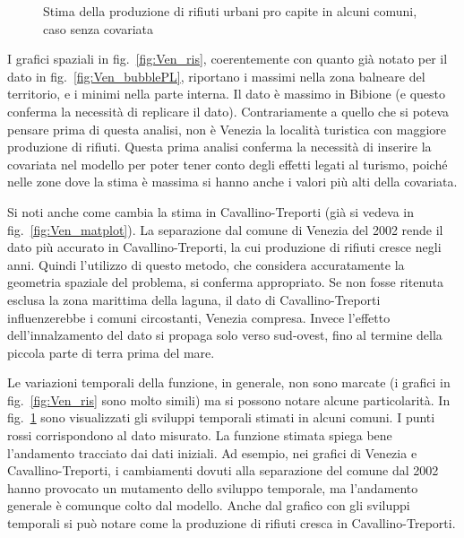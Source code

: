 \documentclass[a4paper,11pt,twoside,openright]{book}							%
\begin{document}
\begin{figure}[t]
{   }
	\caption{Stima della produzione di rifiuti urbani pro capite in alcuni comuni, caso senza covariata}
	\label{fig:Ven_tempo}
\end{figure}

I grafici spaziali in fig.~\ref{fig:Ven_ris}, coerentemente con quanto già notato per il dato in fig.~\ref{fig:Ven_bubblePL}, riportano i massimi nella zona balneare del territorio, e i minimi nella parte interna. Il dato è massimo in Bibione (e questo conferma la necessità di replicare il dato). Contrariamente a quello che si poteva pensare prima di questa analisi, non è Venezia la località turistica con maggiore produzione di rifiuti. Questa prima analisi conferma la necessità di inserire la covariata nel modello per poter tener conto degli effetti legati al turismo, poiché nelle zone dove la stima è massima si hanno anche i valori più alti della covariata.

Si noti anche come cambia la stima in Cavallino-Treporti (già si vedeva in fig.~\ref{fig:Ven_matplot}). La separazione dal comune di Venezia del 2002 rende il dato più accurato in Cavallino-Treporti, la cui produzione di rifiuti cresce negli anni. Quindi l'utilizzo di questo metodo, che considera accuratamente la geometria spaziale del problema, si conferma appropriato. Se non fosse ritenuta esclusa la zona marittima della laguna, il dato di Cavallino-Treporti influenzerebbe i comuni circostanti, Venezia compresa. Invece l'effetto dell'innalzamento del dato si propaga solo verso sud-ovest, fino al termine della piccola parte di terra prima del mare.

Le variazioni temporali della funzione, in generale, non sono marcate (i grafici in fig.~\ref{fig:Ven_ris} sono molto simili) ma si possono notare alcune particolarità. In fig.~\ref{fig:Ven_tempo} sono visualizzati gli sviluppi temporali stimati in alcuni comuni. I punti rossi corrispondono al dato misurato. La funzione stimata spiega bene l'andamento tracciato dai dati iniziali. Ad esempio, nei grafici di Venezia e Cavallino-Treporti, i cambiamenti dovuti alla separazione del comune dal 2002 hanno provocato un mutamento dello sviluppo temporale, ma l'andamento generale è comunque colto dal modello. Anche dal grafico con gli sviluppi temporali si può notare come la produzione di rifiuti cresca in Cavallino-Treporti.
\end{document}

